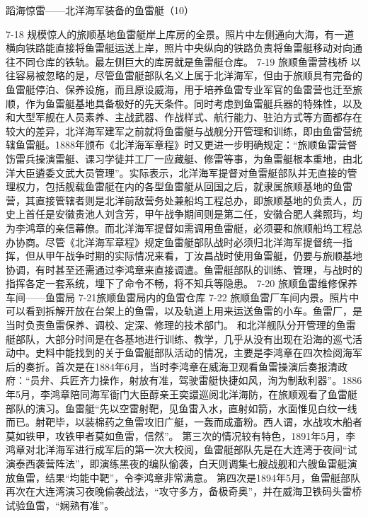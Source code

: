 \documentclass[12pt,UTF8]{ctexbook}
\begin{document}
蹈海惊雷——北洋海军装备的鱼雷艇（10）

7-18
规模惊人的旅顺基地鱼雷艇岸上库房的全景。照片中左侧通向大海，有一道横向铁路能直接将鱼雷艇运送上岸，照片中央纵向的铁路负责将鱼雷艇移动对向通往不同仓库的铁轨。最左侧巨大的库房就是鱼雷艇仓库。
7-19 旅顺鱼雷营栈桥
以往容易被忽略的是，尽管鱼雷艇部队名义上属于北洋海军，但由于旅顺具有完备的鱼雷艇停泊、保养设施，而且原设威海，用于培养鱼雷专业军官的鱼雷营也迁至旅顺，作为鱼雷艇基地具备极好的先天条件。同时考虑到鱼雷艇兵器的特殊性，以及和大型军舰在人员素养、主战武器、作战样式、航行能力、驻泊方式等方面都存在较大的差异，北洋海军建军之前就将鱼雷艇与战舰分开管理和训练，即由鱼雷营统辖鱼雷艇。1888年颁布《北洋海军章程》时又更进一步明确规定：“旅顺鱼雷营督饬雷兵操演雷艇、课习学徒并工厂一应藏艇、修雷等事，为鱼雷艇根本重地，由北洋大臣遴委文武大员管理”。实际表示，北洋海军提督对鱼雷艇部队并无直接的管理权力，包括舰载鱼雷艇在内的各型鱼雷艇从回国之后，就隶属旅顺基地的鱼雷营，其直接管辖者则是北洋前敌营务处兼船坞工程总办，即旅顺基地的负责人，历史上首任是安徽贵池人刘含芳，甲午战争期间则是第二任，安徽合肥人龚照玙，均为李鸿章的亲信幕僚。而北洋海军提督如需调用鱼雷艇，必须要和旅顺船坞工程总办协商。尽管《北洋海军章程》规定鱼雷艇部队战时必须归北洋海军提督统一指挥，但从甲午战争时期的实际情况来看，丁汝昌战时使用鱼雷艇，仍要与旅顺基地协调，有时甚至还需通过李鸿章来直接调遣。鱼雷艇部队的训练、管理，与战时的指挥各定一套系统，埋下了命令不畅，将不知兵等隐患。
7-20 旅顺鱼雷维修保养车间——鱼雷局
7-21旅顺鱼雷局内的鱼雷仓库
7-22
旅顺鱼雷厂车间内景。照片中可以看到拆解开放在台架上的鱼雷，以及轨道上用来运送鱼雷的小车。鱼雷厂，是当时负责鱼雷保养、调校、定深、修理的技术部门。
和北洋舰队分开管理的鱼雷艇部队，大部分时间是在各基地进行训练、教学，几乎从没有出现在沿海的巡弋活动中。史料中能找到的关于鱼雷艇部队活动的情况，主要是李鸿章在四次检阅海军后的奏折。首次是在1884年6月，当时李鸿章在威海卫观看鱼雷操演后奏报清政府：“员弁、兵匠齐力操作，射放有准，驾驶雷艇快捷如风，洵为制敌利器”。1886年5月，李鸿章陪同海军衙门大臣醇亲王奕譞巡阅北洋海防，在旅顺观看了鱼雷艇部队的演习。鱼雷艇“先以空雷射靶，见鱼雷入水，直射如箭，水面惟见白纹一线而已。射靶毕，以装棉药之鱼雷攻旧广艇，一轰而成齑粉。西人谓，水战攻木船者莫如铁甲，攻铁甲者莫如鱼雷，信然”。 第三次的情况较有特色，1891年5月，李鸿章对北洋海军进行成军后的第一次大校阅，鱼雷艇部队先是在大连湾于夜间“试演泰西袭营阵法”，即演练黑夜的编队偷袭，白天则调集七艘战舰和六艘鱼雷艇演放鱼雷，结果“均能中靶”，令李鸿章非常满意。 第四次是1894年5月，鱼雷艇部队再次在大连湾演习夜晚偷袭战法，“攻守多方，备极奇奥”，并在威海卫铁码头雷桥试验鱼雷，“娴熟有准”。
\end{document}
